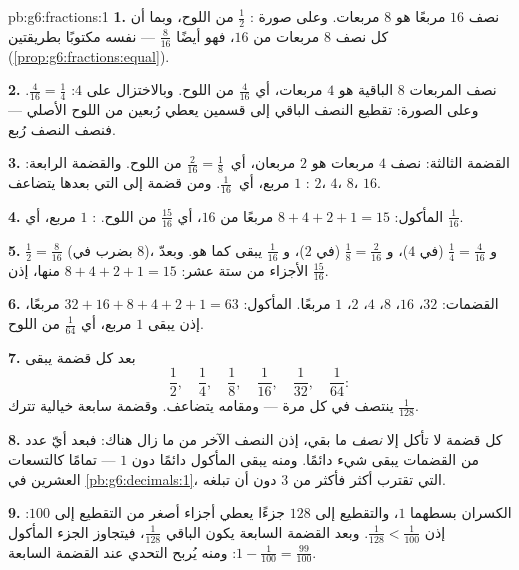 \begin{solution}{pb:g6:fractions:1}
\textbf{1.} نصف $16$ مربعًا هو $8$ مربعات. وعلى صورة :
$\frac12$ من اللوح، وبما أن كل نصف $8$ مربعات من
$16$، فهو أيضًا $\frac{8}{16}$ ---  نفسه مكتوبًا بطريقتين
(\cref{prop:g6:fractions:equal}).

\textbf{2.} نصف المربعات $8$ الباقية هو $4$ مربعات،
أي $\frac{4}{16}$ من اللوح. وبالاختزال على $4$:
$\frac{4}{16} = \frac14$. وعلى الصورة: تقطيع النصف
الباقي إلى قسمين يعطي رُبعين من اللوح الأصلي --- فنصف
النصف رُبع.

\textbf{3.} القضمة الثالثة: نصف $4$ مربعات هو $2$ مربعان، أي\
$\frac{2}{16} = \frac18$ من اللوح. والقضمة الرابعة: $1$ مربع،
أي\ $\frac{1}{16}$. ومن قضمة إلى التي بعدها يتضاعف
: $2$، $4$، $8$، $16$.

\textbf{4.} المأكول: $8 + 4 + 2 + 1 = 15$ مربعًا من $16$، أي
$\frac{15}{16}$ من اللوح. : $1$ مربع، أي $\frac{1}{16}$.

\textbf{5.} $\frac12 = \frac{8}{16}$ (بضرب   في
$8$)، و $\frac14 = \frac{4}{16}$ (في $4$)، و $\frac18 = \frac{2}{16}$
(في $2$)، و $\frac{1}{16}$ يبقى كما هو. وبعدّ الأجزاء من ستة عشر:
$8 + 4 + 2 + 1 = 15$ منها، إذن  $\frac{15}{16}$.

\textbf{6.} القضمات: $32$، $16$، $8$، $4$، $2$، $1$ مربعًا. 
المأكول: $32 + 16 + 8 + 4 + 2 + 1 = 63$ مربعًا، إذن يبقى $1$ مربع،
أي $\frac{1}{64}$ من اللوح.

\textbf{7.} بعد كل قضمة يبقى
\[
\frac12,\quad \frac14,\quad \frac18,\quad \frac{1}{16},\quad
\frac{1}{32},\quad \frac{1}{64} :
\]
 ينتصف في كل مرة --- ومقامه يتضاعف. وقضمة
سابعة خيالية تترك $\frac{1}{128}$.

\textbf{8.} كل قضمة لا تأكل إلا \emph{نصف} ما بقي، إذن
النصف الآخر من  ما زال هناك: فبعد أيّ عدد
من القضمات يبقى شيء دائمًا. ومنه يبقى \omterm{def:g1:addition:def}{المجموع} المأكول
دائمًا دون $1$ --- تمامًا كالتسعات العشرين في
\cref{pb:g6:decimals:1}، التي تقترب أكثر فأكثر من $3$ دون أن
تبلغه.

\textbf{9.} الكسران بسطهما $1$، والتقطيع إلى
$128$ جزءًا يعطي أجزاء أصغر من التقطيع إلى $100$: إذن
$\frac{1}{128} < \frac{1}{100}$. وبعد القضمة السابعة يكون
الباقي $\frac{1}{128}$، فيتجاوز الجزء المأكول
$1 - \frac{1}{100} = \frac{99}{100}$: ومنه يُربح التحدي عند
القضمة السابعة.


\end{solution}
